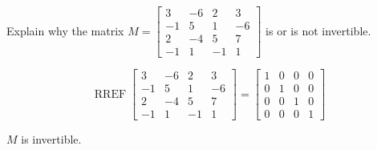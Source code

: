 
\begin{exerciseStatement}


Explain why the matrix \(M= \left[\begin{array}{cccc}
3 & -6 & 2 & 3 \\
-1 & 5 & 1 & -6 \\
2 & -4 & 5 & 7 \\
-1 & 1 & -1 & 1
\end{array}\right] \) is or is not invertible.


\end{exerciseStatement}
    
\begin{exerciseAnswer} 


\[\operatorname{RREF} \left[\begin{array}{cccc}
3 & -6 & 2 & 3 \\
-1 & 5 & 1 & -6 \\
2 & -4 & 5 & 7 \\
-1 & 1 & -1 & 1
\end{array}\right] = \left[\begin{array}{cccc}
1 & 0 & 0 & 0 \\
0 & 1 & 0 & 0 \\
0 & 0 & 1 & 0 \\
0 & 0 & 0 & 1
\end{array}\right] \]

\(M\) is invertible.
\end{exerciseAnswer}
    
